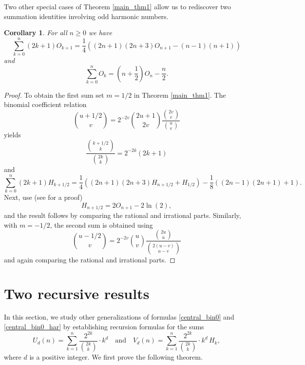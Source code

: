 \documentclass[11pt,reqno]{amsart}
\theoremstyle{plain}
\numberwithin{equation}{section}
\newtheorem{corollary}[thm]{Corollary}
\begin{document}
Two other special cases of Theorem \ref{main_thm1} allow us to rediscover two summation identities involving odd harmonic numbers.

\begin{corollary}
For all $n\geq 0$ we have
\begin{equation}\label{central_bin_ohar1}
\sum_{k=0}^n (2k+1) O_{k+1} = \frac{1}{4}\left ( (2n+1)(2n+3)O_{n+1} - (n-1)(n+1) \right )
\end{equation}
and
\begin{equation}\label{central_bin_ohar2}
\sum_{k=0}^n O_{k} = \left (n+\frac{1}{2}\right ) O_{n} - \frac{n}{2}.
\end{equation}
\end{corollary}
\begin{proof}
To obtain the first sum set $m=1/2$ in Theorem \ref{main_thm1}. The binomial coefficient relation
$$\binom{u+1/2}{v} = 2^{-2v} \binom{2u+1}{2v} \frac{\binom{2v}{v}}{\binom{u}{v}}$$ 
yields
$$\frac{\binom{k+1/2}{k}}{\binom{2k}{k}} = 2^{-2k} (2k+1)$$
and
$$\sum_{k=0}^n (2k+1) H_{k+1/2} = \frac{1}{4}\left ( (2n+1)(2n+3)H_{n+1/2} + H_{1/2} \right ) -\frac{1}{8} \left ((2n-1)(2n+1)+1 \right ). 
$$
Next, use (see \cite{Adegoke0} for a proof)
$$H_{n+1/2} = 2O_{n+1} - 2 \ln(2),$$
and the result follows by comparing the rational and irrational parts. Similarly, with $m=-1/2$, the second sum is obtained using
$$\binom{u-1/2}{v} = 2^{-2v} \binom{u}{v} \frac{\binom{2u}{u}}{\binom{2(u-v)}{u-v}}$$
and again comparing the rational and irrational parts.
\end{proof}

\section{Two recursive results}

In this section, we study other generalizations of formulas \eqref{central_bin0} and \eqref{central_bin0_har} by establishing recursion formulas for the sums
\begin{equation*}
U_d(n) = \sum_{k=1}^n \frac{2^{2k}}{\binom{2k}{k}} \cdot k^d \quad \mbox{and}\quad  
V_d(n) = \sum_{k=1}^n \frac{2^{2k}}{\binom{2k}{k}}\cdot k^d\,H_k,
\end{equation*}
where $d$ is a positive integer. We first prove the following theorem.
\end{document}
